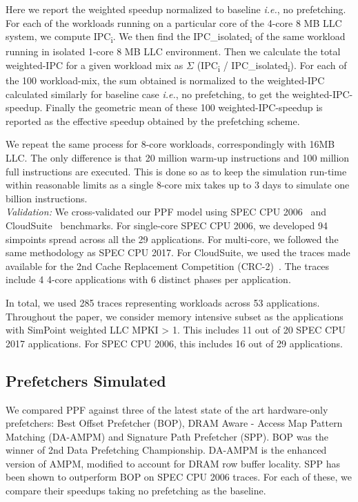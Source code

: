 Here we report the weighted speedup normalized to baseline
\textit{i.e.}, no prefetching. For each of the workloads running on a
particular core of the 4-core 8 MB LLC system, we compute
IPC\textsubscript{i}. We then find the IPC\_isolated\textsubscript{i}
of the same workload running in isolated 1-core 8 MB LLC environment.
Then we calculate the total weighted-IPC for a given workload mix as
$\Sigma$ (IPC\textsubscript{i} / IPC\_isolated\textsubscript{i}). For
each of the 100 workload-mix, the sum obtained is normalized to the
weighted-IPC calculated similarly for baseline case \textit{i.e.}, no
prefetching, to get the weighted-IPC-speedup. Finally the geometric
mean of these 100 weighted-IPC-speedup is reported as the effective
speedup obtained by the prefetching scheme.

We repeat the same process for 8-core workloads, correspondingly with 16MB
LLC. The only difference is that 20 million warm-up instructions and 100
million full instructions are executed. This is done so as to keep the
simulation run-time within reasonable limits as a single 8-core mix takes up
to 3 days to simulate one billion instructions.\\
%
\noindent \textit{Validation:} We cross-validated our PPF model using SPEC
CPU 2006~\cite{SPEC2006} and CloudSuite~\cite{CloudSuite} benchmarks. For
single-core SPEC CPU 2006, we developed 94 simpoints spread across all the 29
applications. For multi-core, we followed the same methodology as SPEC CPU 2017.
For CloudSuite, we used the traces made available for the 2nd Cache
Replacement Competition (CRC-2)~\cite{CRC_2}. The traces include 4 4-core
applications with 6 distinct phases per application.

In total, we used 285 traces representing workloads across 53 applications.
Throughout the paper, we consider memory intensive subset as the
applications with SimPoint weighted LLC MPKI > 1. This includes 11 out of 
20 SPEC CPU 2017 applications. For SPEC CPU 2006, this includes 16 out of 
29 applications.

\subsection{Prefetchers Simulated}
\label{Method-Prefetchers}
We compared PPF against three of the latest state of the art hardware-only
prefetchers: Best Offset Prefetcher (BOP), DRAM Aware - Access Map Pattern
Matching (DA-AMPM) \cite{DA_AMPM} and Signature Path Prefetcher (SPP). BOP was
the winner of 2nd Data Prefetching Championship. DA-AMPM is the enhanced
version of AMPM, modified to account for DRAM row buffer locality. SPP has
been shown to outperform BOP on SPEC CPU 2006 traces. For each of these, we
compare their speedups taking no prefetching as the baseline.

